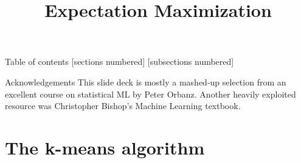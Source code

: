 \documentclass[10pt]{beamer}
\title{Expectation Maximization}
\begin{document}
\maketitle
\begin{frame}{Table of contents}
  [sections numbered]
  [subsections numbered]
  \tableofcontents
\end{frame}

\begin{frame}{Acknowledgements}
This slide deck is mostly a mashed-up selection from an excellent course on statistical ML by Peter Orbanz.    Another heavily exploited resource was Christopher Bishop's Machine Learning textbook.
\end{frame}

\section{The k-means algorithm}
\end{document}
